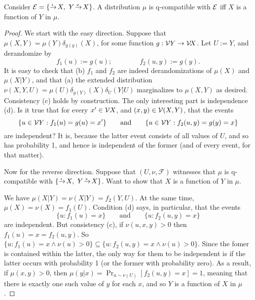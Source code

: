 \documentclass{article}
\newcommand{\CI}{\mathbin{\bot\!\!\!\bot}}
\begin{document}
\begin{prop}
    Consider $\Ed = \{ \ed 1{}{\!X},~ \ed2{Y\!}{\!X} \}$.
    A distribution $\mu$ is q-compatible with $\mathcal E$ iff
    $X$ is a function of $Y$ in $\mu$.
\end{prop}
\begin{proof}
    We start with the easy direction.  Suppose that $\mu(X,Y) = \mu(Y) \delta_{g(y)}(X)$, for some function $g : \mathcal V Y \to \mathcal V\! X$. 
    Let $U := Y$, and derandomize by
    \[
        f_1(u) := g(u); \qquad\qquad
        f_2(u,y) := g(y).
    \]
    It is easy to check that (b) $f_1$ and $f_2$ are indeed derandomizations of $\mu(X)$ and $\mu(X|Y)$, and that (a) the extended distribution 
    $\nu(X,Y,U) = \mu(U) \delta_{g(Y)}(X) \delta_{U}(Y|U)$
    marginalizes to $\mu(X,Y)$ as desired.
    Consistency (c) holds by construction.
    The only interesting part  is independence (d). 
    Is it true that for every $x' \in \mathcal V X$, and $(x,y) \in \mathcal V(X,Y)$, that the events
    \[
        \{ u \in \mathcal V Y : f_1(u) = g(u) = x' \}
        \qquad\text{and}\qquad
        \{ u \in \mathcal V Y : f_2(u,y) = g(y) = x\}
    \]
    are independent? It is, because the latter event consists of all values of $U$, and so has probability 1, and hence is independent of the former (and of every event, for that matter). 
    
    Now for the reverse direction. Suppose that $(U, \nu, \mathcal F)$ witnesses that $\mu$ is q-compatible with $\{ \ed 1{}{\!X},~ \ed2{Y\!}{\!X} \}$. 
    Want to show that $X$ is a function of $Y$ in $\mu$.
    
    We have $\mu(X|Y) = \nu(X|Y) = f_2(Y,U).$
    At the same time, $\mu(X) = \nu(X) = f_1(U)$. 
    Condition (d) says, in particular, that the events
    \[
        \{ u : f_1(u) = x \} \qquad\text{and}\qquad
        \{ u : f_2(u, y) = x\}
    \]
    are independent. But consistency (c), if $\nu(u,x,y)>0$ then $f_1(u) = x = f_2(u,y)$.
    So 
    $
        \{ u : f_1(u) = x \land \nu(u)>0\} \subseteq \{u : f_2(u,y) = x \land \nu(u)> 0\}
    $.
    Since the fomer is contained within the latter, the only way for them to be independent is if the latter occurs with probability 1 (or the former with probability zero). 
    As a result, if $\mu(x,y) > 0$, then $\mu(y|x) = \Pr_{u \sim \nu(U)}[ f_2(u,y) = x] = 1$, meaning that there is exactly one such value of $y$ for each $x$, and so $Y$ is a function of $X$ in $\mu$. 
\end{proof}
\end{document}
